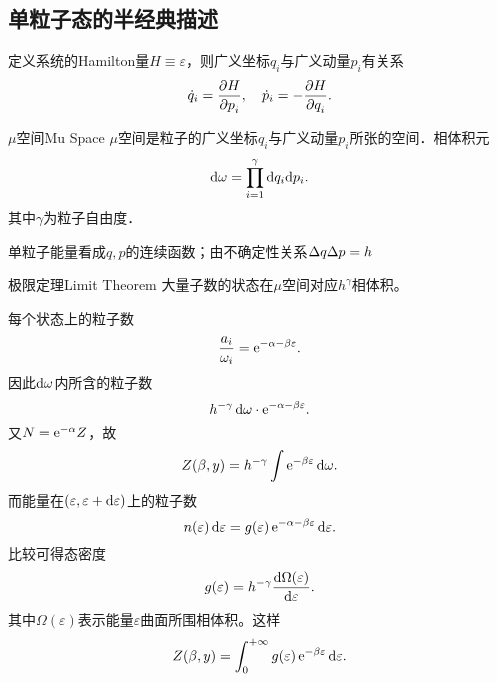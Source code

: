 \subsection{单粒子态的半经典描述}
定义系统的Hamilton量$H\equiv\varepsilon$，则广义坐标$q_i$与广义动量$p_i$有关系
\[
	\dot q_i=\pv H{p_i},\quad\dot p_i=-\pv H{q_i}.
\]
\begin{definition}{$\mu$空间}{Mu Space}
	$\mu$空间是粒子的广义坐标$q_i$与广义动量$p_i$所张的空间．相体积元
	\begin{align}
		\mathop{}\!\mathrm{d}\omega=\prod_{i=1}^\gamma\mathop{}\!\mathrm{d} q_i\mathrm{d} p_i.
	\end{align}
	其中$\gamma$为粒子自由度．
\end{definition}
单粒子能量看成$q,p$的连续函数；由不确定性关系$\Delta q\Delta p=h$
\begin{theorem}{极限定理}{Limit Theorem}
	大量子数的状态在$\mu$空间对应$h^\gamma$相体积。
\end{theorem}
每个状态上的粒子数
\begin{align}
	\frac{a_i}{\omega_i}=\mathop{}\!\mathrm{e}^{-\alpha-\beta\varepsilon}.
\end{align}
因此$\mathop{}\!\mathrm{d}\omega$内所含的粒子数
\[
	h^{-\gamma}\mathop{}\!\mathrm{d}\omega\cdot\mathop{}\!\mathrm{e}^{-\alpha-\beta\varepsilon}.
\]
又$N=\mathop{}\!\mathrm{e}^{-\alpha}Z$，故
\begin{align}
	Z(\beta,y)=h^{-\gamma}\int\mathop{}\!\mathrm{e}^{-\beta\varepsilon}\mathop{}\!\mathrm{d}\omega.
\end{align}
而能量在$\left(\varepsilon,\varepsilon+\mathop{}\!\mathrm{d}\varepsilon\right)$上的粒子数
\[
	n(\varepsilon)\mathop{}\!\mathrm{d}\varepsilon=g(\varepsilon)\mathop{}\!\mathrm{e}^{-\alpha-\beta\varepsilon}\mathop{}\!\mathrm{d}\varepsilon.
\]
比较可得态密度
\[
	g(\varepsilon)=h^{-\gamma}\frac{\mathrm{d}^{\;\!\!}\Omega(\varepsilon)}{\mathrm{d} \varepsilon^{\;\!\!}}.
\]
其中$\Omega(\varepsilon)$表示能量$\varepsilon$曲面所围相体积。这样
\begin{align}
	Z(\beta,y)=\int_0^{+\infty} g(\varepsilon)\mathop{}\!\mathrm{e}^{-\beta\varepsilon}\mathop{}\!\mathrm{d}\varepsilon.
\end{align}
\newpage
